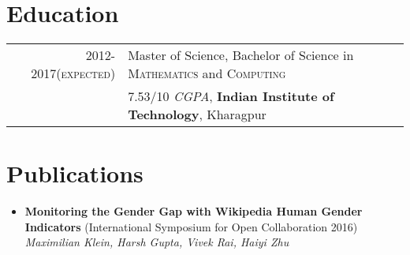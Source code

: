 \documentclass[a4paper,10pt]{article}
\begin{document}
\section{Education}

\begin{tabular}{rl}
    \textsc{2012-2017(expected)} & Master of Science, Bachelor of Science in
    \textsc{Mathematics} and \textsc{Computing}
    \\&7.53/10 \small\emph{CGPA},
    \normalsize\textbf{Indian Institute of Technology}, Kharagpur\\
\end{tabular}

\section{Publications}

\begin{itemize}
\item  \textbf{Monitoring the Gender Gap with Wikipedia Human Gender Indicators}
    (International Symposium for Open Collaboration 2016)\\
    \textit{Maximilian Klein, Harsh Gupta, Vivek Rai, Haiyi Zhu}
\end{itemize}


%
%
%
%
%
%
\end{document}
